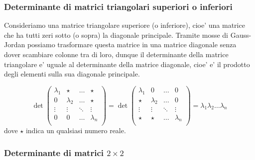 \subsubsection{Determinante di matrici triangolari superiori o inferiori}

Consideriamo una matrice triangolare superiore (o inferiore), cioe' una matrice che ha tutti zeri sotto (o sopra) la diagonale principale. Tramite mosse di Gauss-Jordan possiamo trasformare questa matrice in una matrice diagonale senza dover scambiare colonne tra di loro, dunque il determinante della matrice triangolare e' uguale al determinante della matrice diagonale, cioe' e' il prodotto degli elementi sulla sua diagonale principale.

\begin{equation*}
    \det \begin{pmatrix}
        \lambda_1   &\star      &\dots  &\star \\
        0           &\lambda_2  &\dots  &\star \\
        \vdots      &\vdots     &\ddots &\vdots \\
        0           &0          &\dots  &\lambda_n \\
    \end{pmatrix} = \det \begin{pmatrix}
        \lambda_1   &0          &\dots  &0 \\
        \star       &\lambda_2  &\dots  &0 \\
        \vdots      &\vdots     &\ddots &\vdots \\
        \star       &\star      &\dots  &\lambda_n \\
    \end{pmatrix} = \lambda_1 \lambda_2 \dots \lambda_n
\end{equation*}
dove $\star$ indica un qualsiasi numero reale.

\subsubsection{Determinante di matrici $2 \times 2$}

